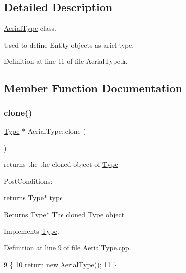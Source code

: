 \subsection{Detailed Description}
\hyperlink{classAerialType}{Aerial\+Type} class. 

Used to define Entity objects as ariel type. 

Definition at line 11 of file Aerial\+Type.\+h.



\subsection{Member Function Documentation}
\mbox{\label{classAerialType_a8e7184b0b9e184142144df65f3da7fb1}} 
\subsubsection{\texorpdfstring{clone()}{clone()}}
{\footnotesize\ttfamily \hyperlink{classType}{Type} $\ast$ Aerial\+Type\+::clone (\begin{DoxyParamCaption}{ }\end{DoxyParamCaption})\hspace{0.3cm}{\ttfamily [virtual]}}



returns the the cloned object of \hyperlink{classType}{Type} 

Post\+Conditions\+:
\begin{DoxyItemize}
\item returns Type$\ast$ type
\end{DoxyItemize}

\begin{DoxyReturn}{Returns}
Type$\ast$ The cloned \hyperlink{classType}{Type} object 
\end{DoxyReturn}


Implements \hyperlink{classType_a7b79d264e2cbac9c091cdb41ffb112c9}{Type}.



Definition at line 9 of file Aerial\+Type.\+cpp.


\begin{DoxyCode}
9                         \{
10     \textcolor{keywordflow}{return} \textcolor{keyword}{new} \hyperlink{classAerialType_af31f880cd2a2437544e77d38f60d1c99}{AerialType}();
11 \}
\end{DoxyCode}
\mbox{\label{classAerialType_a66dd43f2688de9a5eab9c6de0396e9cc}} 
